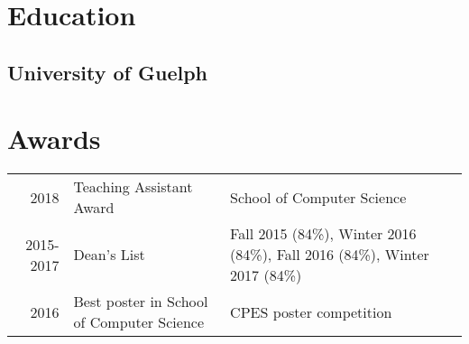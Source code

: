 \documentclass[]{chris_katsaras_resume}
\begin{document}
\begin{minipage}[t]{1\textwidth}
\section{Education} 

\subsection{University of Guelph}
\sectionsep


\section{Awards} 
\begin{tabular}{rll}
2018         & Teaching Assistant Award &  School of Computer Science\\
2015-2017    & Dean's List  & Fall 2015 (84\%), Winter 2016 (84\%), Fall 2016 (84\%), Winter 2017 (84\%)\\
2016	     & Best poster in School of Computer Science & CPES poster competition \\

\end{tabular}

\end{minipage} 
\end{document}

